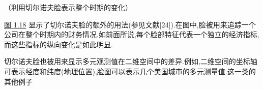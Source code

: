 
\begin{mvfigure}
\label{fig:1.17}
\end{mvfigure}

\quad（利用切尔诺夫脸表示整个时期的变化）

\hyperref[fig:1.18]{图 1.18} 显示了切尔诺夫脸的额外的用法(参见文献[24]).在图中,脸被用来追踪一个公司在整个时期内的财务情况.如前面所说,每个脸部特征代表一个独立的经济指标,而这些指标的纵向变化是如此明显.

\begin{mvfigure}
\label{fig:1.18}
\end{mvfigure}

切尔诺夫脸也被用来显示多元观测值在二维空间中的差异.例如,二维空间的坐标轴可表示经度和纬度(地理位置),脸图可以表示几个美国城市的多元测量值.这一类的其他例子%
